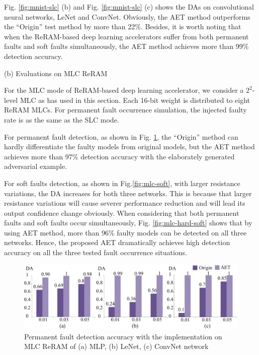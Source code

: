Fig. \ref{fig:mnist-slc} (b) and Fig. \ref{fig:mnist-slc} (c) shows the DAs on convolutional neural networks, LeNet and ConvNet. Obviously,  the AET method outperforms the ``Origin'' test method by more than 22\%. Besides, it is worth noting that when the ReRAM-based deep learning accelerators suffer from both permanent faults and soft faults simultaneously, the AET method achieves more than 99\% detection accuracy.

(b) Evaluations on MLC ReRAM

For the MLC mode of ReRAM-based deep learning accelerator, we consider a $2^2$-level MLC as  \cite{7551379} has used in this section. Each 16-bit weight is distributed to eight ReRAM MLCs. For permanent fault occurrence simulation, the injected faulty rate is as the same as the SLC mode.

For permanent fault detection, as shown in Fig. \ref{fig:mlc-hard}, the ``Origin'' method can hardly differentiate the faulty models from original models, but the AET method achieves more than 97\% detection accuracy with the elaborately generated adversarial example.  

For soft faults detection, as shown in Fig.\ref{fig:mlc-soft}, with larger resistance variations, the DA increases for both three networks. This is because that larger resistance variations will cause severer performance reduction and will lead its output confidence change obviously.  
When considering that both permanent faults and soft faults occur simultaneously, Fig. \ref{fig:mlc-hard-soft} shows that by using AET method, more than 96\% faulty models can be detected on all three networks. Hence, the proposed AET  dramatically achieves high detection accuracy on all the three tested fault occurrence situations.


\begin{figure}
    \centering
    \includegraphics[width=0.75\linewidth]{images/OL-fig11}
    \caption{Permanent fault detection accuracy with the implementation on MLC ReRAM of (a) MLP, (b) LeNet, (c) ConvNet network}
    \label{fig:mlc-hard}
    \vspace{-10pt}
\end{figure}

